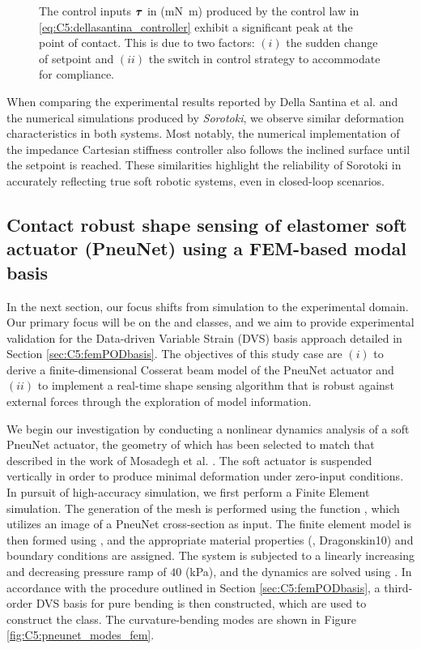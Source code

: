 {\begin{figure}[!t]
    \caption{\small The control inputs $\boldsymbol{\tau}$ in (\si{\milli \newton \meter}) produced by the control law in \eqref{eq:C5:dellasantina_controller} exhibit a significant peak at the point of contact. This is due to two factors: $(i)$ the sudden change of setpoint and $(ii)$ the switch in control strategy to accommodate for compliance.}
    \label{fig:C5:dellasantina_input}
\end{figure}
\clearpage
}

When comparing the experimental results reported by Della Santina et al. \cite{DellaSantina2020Jan} and the numerical simulations produced by \textit{Sorotoki}, we observe similar deformation characteristics in both systems. Most notably, the numerical implementation of the impedance Cartesian stiffness controller also follows the inclined surface until the setpoint is reached. These similarities highlight the reliability of Sorotoki in accurately reflecting true soft robotic systems, even in closed-loop scenarios. 

\subsection[Contact robust shape sensing of elastomer soft actuator]{Contact robust shape sensing of elastomer soft actuator (PneuNet) using a FEM-based modal basis}
In the next section, our focus shifts from simulation to the experimental domain. Our primary focus will be on the  and  classes, and we aim to provide experimental validation for the Data-driven Variable Strain (DVS) basis approach detailed in Section \ref{sec:C5:femPODbasis}. The objectives of this study case are $(i)$ to derive a finite-dimensional Cosserat beam model of the PneuNet actuator and $(ii)$ to implement a real-time shape sensing algorithm that is robust against external forces through the exploration of model information.

We begin our investigation by conducting a nonlinear dynamics analysis of a soft PneuNet actuator, the geometry of which has been selected to match that described in the work of Mosadegh et al. \cite{Mosadegh2014}. The soft actuator is suspended vertically in order to produce minimal deformation under zero-input conditions. In pursuit of high-accuracy simulation, we first perform a Finite Element simulation. The generation of the mesh is performed using the function , which utilizes an image of a PneuNet cross-section as input. The finite element model is then formed using , and the appropriate material properties (\ie, Dragonskin10) and boundary conditions are assigned. The system is subjected to a linearly increasing and decreasing pressure ramp of $40$ (\si{\kilo \pascal}), and the dynamics are solved using . In accordance with the procedure outlined in Section \ref{sec:C5:femPODbasis}, a third-order DVS basis for pure bending is then constructed, which are used to construct the  class. The curvature-bending modes are shown in Figure \ref{fig:C5:pneunet_modes_fem}. 
%

